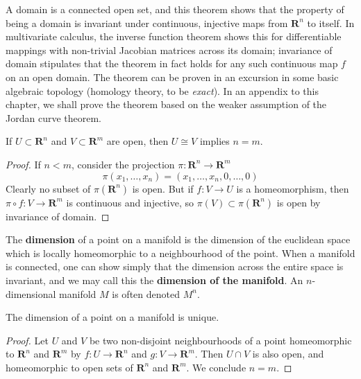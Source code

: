 A domain is a connected open set, and this theorem shows that the property of being a domain is invariant under continuous, injective maps from $\mathbf{R}^n$ to itself. In multivariate calculus, the inverse function theorem shows this for differentiable mappings with non-trivial Jacobian matrices across its domain; invariance of domain stipulates that the theorem in fact holds for any such continuous map $f$ on an open domain. The theorem can be proven in an excursion in some basic algebraic topology (homology theory, to be {\it exact}). In an appendix to this chapter, we shall prove the theorem based on the weaker assumption of the Jordan curve theorem.

\begin{lemma}
    If $U \subset \mathbf{R}^n$ and $V \subset \mathbf{R}^m$ are open, then $U \cong V$ implies $n = m$.
\end{lemma}
\begin{proof}
    If $n < m$, consider the projection $\pi: \mathbf{R}^n \to \mathbf{R}^m$
    \[ \pi(x_1, \dots, x_n) = (x_1, \dots, x_n, 0, \dots, 0) \]
    Clearly no subset of $\pi(\mathbf{R}^n)$ is open. But if $f: V \to U$ is a homeomorphism, then $\pi \circ f: V \to \mathbf{R}^m$ is continuous and injective, so $\pi(V) \subset \pi(\mathbf{R}^n)$ is open by invariance of domain.
\end{proof}

The {\bf dimension} of a point on a manifold is the dimension of the euclidean space which is locally homeomorphic to a neighbourhood of the point. When a manifold is connected, one can show simply that the dimension across the entire space is invariant, and we may call this the {\bf dimension of the manifold}. An $n$-dimensional manifold $M$ is often denoted $M^n$.

\begin{corollary}
    The dimension of a point on a manifold is unique.
\end{corollary}
\begin{proof}
    Let $U$ and $V$ be two non-disjoint neighbourhoods of a point homeomorphic to $\mathbf{R}^n$ and $\mathbf{R}^m$ by $f:U \to \mathbf{R}^n$ and $g:V \to \mathbf{R}^m$. Then $U \cap V$ is also open, and homeomorphic to open sets of $\mathbf{R}^n$ and $\mathbf{R}^m$. We conclude $n = m$.
\end{proof}

